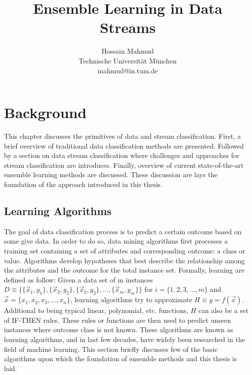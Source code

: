 \documentclass[a4paper, 11pt, oneside]{book}
\begin{document}
\title{Ensemble Learning in Data Streams}


\author{
Hossain Mahmud \\
Technische Universit\"at M\"unchen\\
mahmud@in.tum.de
}

\date{}


\onehalfspacing



\chapter{Background}
This chapter discusses the primitives of data and stream classification. First, a brief overview of traditional data classification methods are presented. Followed by a section on data stream classification where challenges and approaches for stream classification are introduces. Finally, overview of current state-of-the-art ensemble learning methods are discussed. These discussion are lays the foundation of the approach introduced in this thesis.


\section{Learning Algorithms}
The goal of data classification process is to predict a certain outcome based on some give data. In order to do so, data mining algorithms first processes a training set containing a set of attributes and corresponding outcome: a class or value. Algorithms develop hypotheses that best describe the relationship among the attributes and the outcome for the total instance set. 
Formally, learning are defined as follow: Given a data set of m instances 
$D \equiv \{ \{\vec{x}_1, y_1\}, \{\vec{x}_2, y_2\}, \{\vec{x}_3, y_3\}, \dots, \{\vec{x}_m, y_m\} \}$ 
for $i = \{ 1, 2, 3, \dots, m \}$ and $ \vec{x} = \{x_1, x_2, x_3, \dots, x_n\}$, 
learning algorithms try to approximate $H \equiv y = f(\vec{x})$. 
Additional to being typical linear, polynomial, etc. functions, $H$ can also be a set of IF-THEN rules. 
These rules or functions are then used to predict unseen instances where outcome class is not known. These algorithms are known as learning algorithms, and in last few decades, have widely been researched in the field of machine learning. This section briefly discusses few of the basic algorithms upon which the foundation of ensemble methods and this thesis is laid. 
\end{document}
